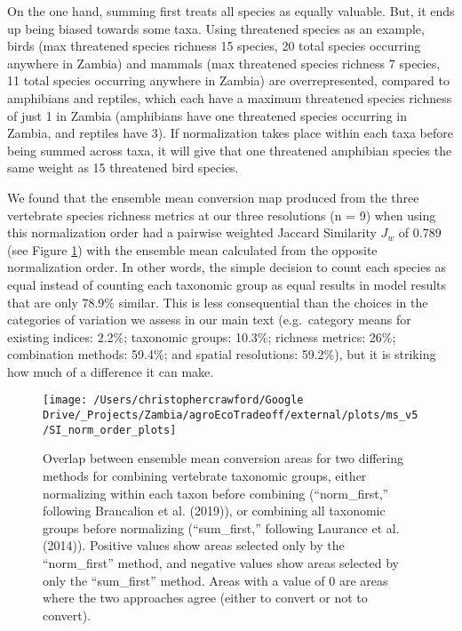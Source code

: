 \documentclass[
]{article}
\begin{document}
On the one hand, summing first treats all species as equally valuable. But, it ends up being biased towards some taxa. Using threatened species as an example, birds (max threatened species richness 15 species, 20 total species occurring anywhere in Zambia) and mammals (max threatened species richness 7 species, 11 total species occurring anywhere in Zambia) are overrepresented, compared to amphibians and reptiles, which each have a maximum threatened species richness of just 1 in Zambia (amphibians have one threatened species occurring in Zambia, and reptiles have 3). If normalization takes place within each taxa before being summed across taxa, it will give that one threatened amphibian species the same weight as 15 threatened bird species.

We found that the ensemble mean conversion map produced from the three vertebrate species richness metrics at our three resolutions (n = 9) when using this normalization order had a pairwise weighted Jaccard Similarity \(J_w\) of 0.789 (see Figure \ref{fig:norm-order}) with the ensemble mean calculated from the opposite normalization order. In other words, the simple decision to count each species as equal instead of counting each taxonomic group as equal results in model results that are only 78.9\% similar. This is less consequential than the choices in the categories of variation we assess in our main text (e.g.~category means for existing indices: 2.2\%; taxonomic groups: 10.3\%; richness metrics: 26\%; combination methods: 59.4\%; and spatial resolutions: 59.2\%), but it is striking how much of a difference it can make.



\begin{figure}

{\centering \texttt{[image: /Users/christophercrawford/Google Drive/\_Projects/Zambia/agroEcoTradeoff/external/plots/ms\_v5/SI\_norm\_order\_plots]} 

}

\caption{Overlap between ensemble mean conversion areas for two differing methods for combining vertebrate taxonomic groups, either normalizing within each taxon before combining (``norm\_first,'' following Brancalion et al. (2019)), or combining all taxonomic groups before normalizing (``sum\_first,'' following Laurance et al. (2014)). Positive values show areas selected only by the ``norm\_first'' method, and negative values show areas selected by only the ``sum\_first'' method. Areas with a value of 0 are areas where the two approaches agree (either to convert or not to convert).}\label{fig:norm-order}
\end{figure}
\end{document}
